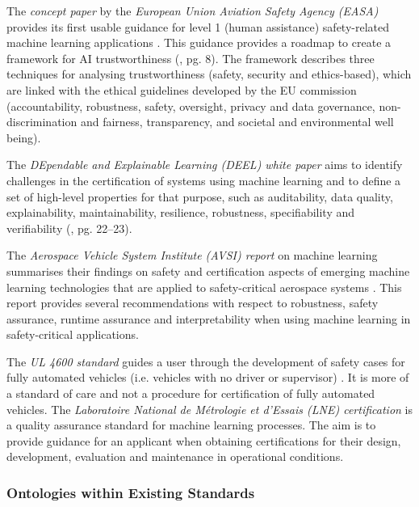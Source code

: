 The \textit{concept paper} by the \textit{European Union Aviation Safety Agency (EASA)} provides its first usable guidance for level 1 (human assistance) safety-related machine learning applications \cite{EASA2021}. 
This guidance provides a roadmap to create a framework for AI trustworthiness (\cite{EASA2021}, pg. 8). The framework describes three techniques for analysing trustworthiness (safety, security and ethics-based), which are linked with the ethical guidelines developed by the EU commission (accountability, robustness, safety, oversight, privacy and data governance, non-discrimination and fairness, transparency, and societal and environmental well being). 

The \textit{DEpendable and Explainable Learning (DEEL) white paper} aims to identify challenges in the certification of systems using machine learning and to define a set of high-level properties for that purpose, such as auditability, data quality, explainability, maintainability, resilience, robustness, specifiability and verifiability (\cite{Mamalet2021}, pg. 22–23). 

The \textit{Aerospace Vehicle System Institute (AVSI) report} on machine learning summarises their findings on safety and certification aspects of emerging machine learning technologies that are applied to safety-critical aerospace systems \cite{AFE2020}. This report provides several recommendations with respect to robustness, safety assurance, runtime assurance and interpretability when using machine learning in safety-critical applications. 

The \textit{UL 4600 standard} guides a user through the development of safety cases for fully automated vehicles (i.e. vehicles with no driver or supervisor) \cite{UL4600}. It is more of a standard of care and not a procedure for certification of fully automated vehicles. The \textit{Laboratoire National de Métrologie et d'Essais (LNE) certification} \cite{LNE2021} is a quality assurance standard for machine learning processes. The aim is to provide guidance for an applicant when obtaining certifications for their design, development, evaluation and maintenance in operational conditions. 

\subsubsection{Ontologies within Existing Standards}\label{sec:tasq-ont-stds}

